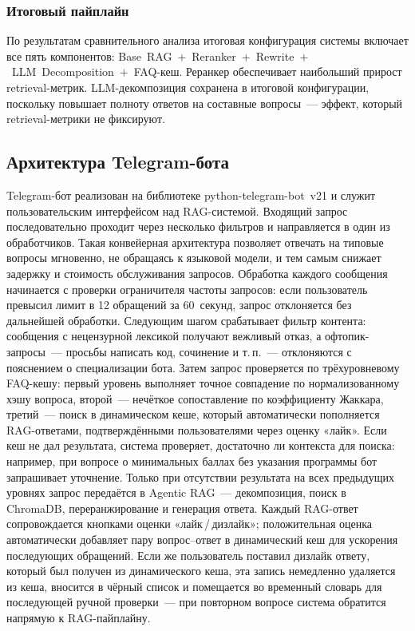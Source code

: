 \documentclass{article}
\begin{document}
\subsubsection{Итоговый пайплайн}

По результатам сравнительного анализа итоговая конфигурация системы включает все пять компонентов:
Base~RAG~$+$~Reranker~$+$~Rewrite~$+$~LLM~Decomposition~$+$~FAQ-кеш. Реранкер обеспечивает наибольший прирост retrieval-метрик. LLM-декомпозиция сохранена в итоговой конфигурации, поскольку повышает полноту ответов на составные вопросы~--- эффект, который retrieval-метрики не фиксируют.





\subsection{Архитектура Telegram-бота}

Telegram-бот реализован на библиотеке python-telegram-bot~v21 и служит пользовательским интерфейсом над RAG-системой. Входящий запрос последовательно проходит через несколько фильтров и направляется в один из обработчиков. Такая конвейерная архитектура позволяет отвечать на типовые вопросы мгновенно, не обращаясь к языковой модели, и тем самым снижает задержку и стоимость обслуживания запросов. Обработка каждого сообщения начинается с проверки ограничителя частоты запросов: если пользователь превысил лимит в 12 обращений за 60~секунд, запрос отклоняется без дальнейшей обработки. Следующим шагом срабатывает фильтр контента: сообщения с нецензурной лексикой получают вежливый отказ, а офтопик-запросы~--- просьбы написать код, сочинение и т.\,п.~--- отклоняются с пояснением о специализации бота. Затем запрос проверяется по трёхуровневому FAQ-кешу: первый уровень выполняет точное совпадение по нормализованному хэшу вопроса, второй~--- нечёткое сопоставление по коэффициенту Жаккара, третий~--- поиск в динамическом кеше, который автоматически пополняется RAG-ответами, подтверждёнными пользователями через оценку «лайк». Если кеш не дал результата, система проверяет, достаточно ли контекста для поиска: например, при вопросе о минимальных баллах без указания программы бот запрашивает уточнение. Только при отсутствии результата на всех предыдущих уровнях запрос передаётся в Agentic RAG~--- декомпозиция, поиск в ChromaDB, переранжирование и генерация ответа. Каждый RAG-ответ сопровождается кнопками оценки «лайк\,/\,дизлайк»; положительная оценка автоматически добавляет пару вопрос–ответ в динамический кеш для ускорения последующих обращений. Если же пользователь поставил дизлайк ответу, который был
получен из динамического кеша, эта запись немедленно удаляется из кеша, вносится
в чёрный список и помещается во временный словарь для последующей ручной проверки~---
при повторном вопросе система обратится напрямую к RAG-пайплайну.
\end{document}
